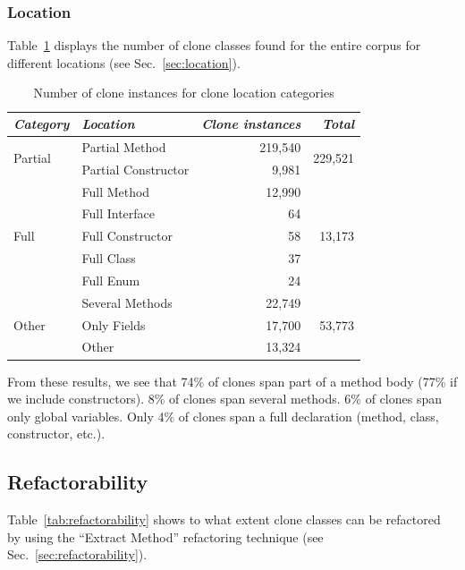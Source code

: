 \documentclass[conference]{IEEEtran}
\begin{document}
\subsubsection{Location}
Table~\ref{tab:location} displays the number of clone classes found for the entire corpus for different locations (see Sec.~\ref{sec:location}).

\begin{table}[H]
\centering
\begin{tabular}{@{}llrr@{}}
\toprule
\textit{\textbf{Category}} & \textit{\textbf{Location}} & \textit{\textbf{Clone instances}} & \textit{\textbf{Total}} \\ \midrule
\multirow{2}{*}{Partial} & Partial Method & 219,540 & \multirow{2}{*}{229,521} \\ \cmidrule(lr){2-3}
 & Partial Constructor & 9,981 &  \\ \midrule
\multirow{5}{*}{Full} & Full Method & 12,990 & \multirow{5}{*}{13,173} \\ \cmidrule(lr){2-3}
 & Full Interface & 64 &  \\ \cmidrule(lr){2-3}
 & Full Constructor & 58 &  \\ \cmidrule(lr){2-3}
 & Full Class & 37 &  \\ \cmidrule(lr){2-3}
 & Full Enum & 24 &  \\ \midrule
\multirow{3}{*}{Other} & Several Methods & 22,749 & \multirow{3}{*}{53,773} \\ \cmidrule(lr){2-3}
 & Only Fields & 17,700 &  \\ \cmidrule(lr){2-3}
 & Other & 13,324 &  \\ \bottomrule
\end{tabular}
\caption{Number of clone instances for clone location categories}
\label{tab:location}
\end{table}

From these results, we see that 74\% of clones span part of a method body (77\% if we include constructors). 8\% of clones span several methods. 6\% of clones span only global variables. Only 4\% of clones span a full declaration (method, class, constructor, etc.).

\subsection{Refactorability}
Table~\ref{tab:refactorability} shows to what extent clone classes can be refactored by using the ``Extract Method'' refactoring technique (see Sec.~\ref{sec:refactorability}).
\end{document}
